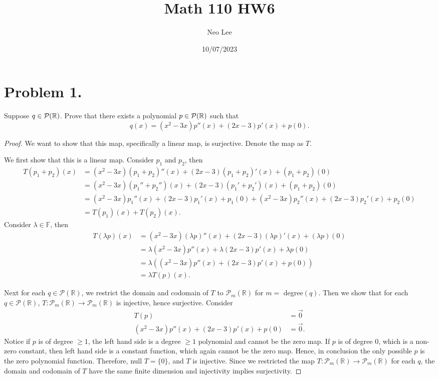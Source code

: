 \documentclass{article}
\title{Math 110 HW6}
\author{Neo Lee}
\date{10/07/2023}
\begin{document}
 

\maketitle 

\section*{Problem 1.}
Suppose $q\in {\cal P}(\mathbb{R})$. Prove that there exists a polynomial 
$p\in {\cal P}(\mathbb{R})$ such that
$$ q(x)= (x^2-3x)p''(x) +(2x-3) p'(x)+p(0).$$
\begin{proof}
    We want to show that this map, specifically a linear map, is surjective. Denote the map as $T$. 

    We first show that this is a linear map.
    Consider $p_1$ and $p_2$, then 
    \begin{align*}
        T(p_1+p_2)(x) & = (x^2-3x)(p_1+p_2)''(x) +(2x-3) (p_1+p_2)'(x)+(p_1+p_2)(0) \\
        & = (x^2-3x)(p_1''+p_2'')(x) +(2x-3) (p_1'+p_2')(x)+(p_1+p_2)(0) \\
        & = (x^2-3x)p_1''(x) +(2x-3) p_1'(x)+p_1(0) + (x^2-3x)p_2''(x) +(2x-3) p_2'(x)+p_2(0) \\
        & = T(p_1)(x) + T(p_2)(x).
    \end{align*}
    Consider $\lambda \in \mathbb{F}$, then 
    \begin{align*}
        T(\lambda p)(x) & = (x^2-3x)(\lambda p)''(x) +(2x-3) (\lambda p)'(x)+(\lambda p)(0) \\
        & = \lambda(x^2-3x)p''(x) +\lambda(2x-3) p'(x)+\lambda p(0) \\
        & = \lambda \left((x^2-3x)p''(x) +(2x-3) p'(x)+p(0)\right) \\
        & = \lambda T(p)(x).
    \end{align*}

    Next for each $q\in\mathcal{P}(\mathbb{R})$, we restrict the domain and codomain of $T$ to 
    $\mathcal{P}_m(\mathbb{R})$ for $m=$ degree$(q)$. Then we show that for each 
    $q\in\mathcal{P}(\mathbb{R})$, $T:\mathcal{P}_m(\mathbb{R})\to\mathcal{P}_m(\mathbb{R})$ is 
    injective, hence surjective. Consider 
    \begin{align*}
        T(p) & = \vec{0} \\
        (x^2-3x)p''(x) +(2x-3) p'(x)+p(0) & = \vec{0}.
    \end{align*}
    Notice if $p$ is of degree $\ge 1$, the left hand side is a degree $\ge 1$ 
    polynomial and cannot be the zero map. If $p$ is of degree 0, which is a non-zero constant, then 
    left hand side is a constant function, which again cannot be the zero map. Hence, in conclusion 
    the only possible $p$ is the zero polynomial function. Therefore, null $T = \{0\}$, and $T$ is 
    injective. Since we restricted the map $T:\mathcal{P}_m(\mathbb{R})\to
    \mathcal{P}_m(\mathbb{R})$ for each $q$, the domain and codomain of 
    $T$ have the same finite dimension and injectivity implies surjectivity.
\end{proof}
\end{document}
